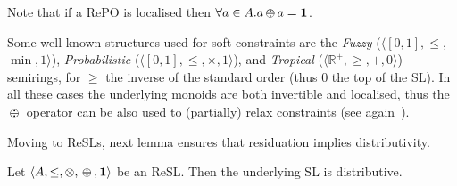 \documentclass{llncs}
\def\monid{{\mathbf 0}}
\def\monop{\otimes}
\def\odiv{\, {\ominus\hspace{-7.7pt} \div} \,}
\def\monid{\mathbf{1}}
\begin{document}
Note that if a RePO is localised then $\forall a \in A. a \odiv a = \monid$.


\begin{remark}\label{rmk:soft}
	Some well-known structures used for soft constraints are the 
	\emph{Fuzzy} ($\langle [0,1], \leq,$ $\min, 1 \rangle$), \emph{Probabilistic} ($\langle [0,1], \leq,\allowbreak\times, 1 \rangle$), 
	and \emph{Tropical}   ($\langle \mathbb{R}^+, \geq, +, 0 \rangle$) semirings, for $\geq$ the inverse of the standard order 
	(thus $0$ the top of the SL). In all these cases the underlying monoids 
	are both invertible and localised, thus
	the $\odiv$ operator can be also used to
	(partially) relax constraints (see again~\cite{ecai06}).
\end{remark}

Moving to ReSLs, next lemma ensures that residuation implies distributivity.

\begin{lemma}
	\label{dist2}
	Let $\langle A, \leq, \monop, \odiv, \monid \rangle$ be an ReSL.
	Then the underlying SL is distributive.
\end{lemma}
\end{document}
